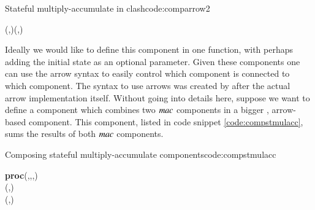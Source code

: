 \begin{texexptitled}{Stateful multiply-accumulate in \gls{clash}}{code:comparrow2}
\begin{hscode}\SaveRestoreHook
{}%
%
%
\>[B]{}\;\;(,)\mathrel{=}(,){}\<[E]%
\\
\>[B]{}\<[5]%
\>[5]{}\;\mathrel{=}\mathbin{+}\mathbin{*}\<[E]%
\ColumnHook
\end{hscode}\resethooks
\begin{hscode}\SaveRestoreHook
{}%
%
\>[B]{}\mathrel{=}\<[E]%
\ColumnHook
\end{hscode}\resethooks
\end{texexptitled}

Ideally we would like to define this component in one function, with perhaps adding the initial state as an optional parameter.
Given these components one can use the \gls{arrow} syntax to easily control which component is connected to which component.
The syntax to use arrows was created\cite{paterson2001new} by \citeauthor{paterson2001new} after the actual arrow implementation itself. 
Without going into details here, suppose we want to define a component which combines two \ensuremath{\Varid{mac}} components in a bigger , arrow-based component.
This component, listed in code snippet \ref{code:compstmulacc}, sums the results of both \ensuremath{\Varid{mac}} components.

\begin{texexptitled}{Composing stateful multiply-accumulate components}{code:compstmulacc}
\begin{hscode}\SaveRestoreHook
{}%
%
%
\>[B]{}\mathrel{=}\textbf{proc}\;(,,,)\to {}\<[E]%
\\
\>[B]{}\<[5]%
\>[5]{}\leftarrow{}\prec(,){}\<[E]%
\\
\>[B]{}\<[5]%
\>[5]{}\leftarrow{}\prec(,){}\<[E]%
\\
\>[B]{}\<[5]%
\>[5]{}\prec{}\mathbin{+}\<[E]%
\ColumnHook
\end{hscode}\resethooks
\end{texexptitled}

